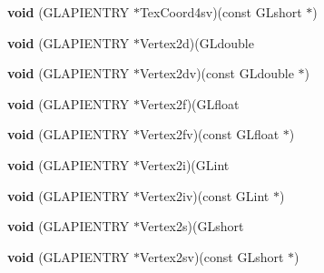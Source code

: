 \begin{DoxyCompactItemize}
\item 
\mbox{\label{struct_____g_ldispatch_table_rec_a38e0e19f1673b1e647ceb3947c328b7c}} 
{\bfseries void} (G\+L\+A\+P\+I\+E\+N\+T\+RY $\ast$Tex\+Coord4sv)(const G\+Lshort $\ast$)
\item 
\mbox{\label{struct_____g_ldispatch_table_rec_adea3ab95cd1e9dc33240e1721c3e088b}} 
{\bfseries void} (G\+L\+A\+P\+I\+E\+N\+T\+RY $\ast$Vertex2d)(G\+Ldouble
\item 
\mbox{\label{struct_____g_ldispatch_table_rec_a8fa01c28a0ea76eeb88a78d87bdfe0e0}} 
{\bfseries void} (G\+L\+A\+P\+I\+E\+N\+T\+RY $\ast$Vertex2dv)(const G\+Ldouble $\ast$)
\item 
\mbox{\label{struct_____g_ldispatch_table_rec_af3f4a8e4058dfa6800a0bccabafb073b}} 
{\bfseries void} (G\+L\+A\+P\+I\+E\+N\+T\+RY $\ast$Vertex2f)(G\+Lfloat
\item 
\mbox{\label{struct_____g_ldispatch_table_rec_a1facc47476b4cf04b6df57d4a36a3519}} 
{\bfseries void} (G\+L\+A\+P\+I\+E\+N\+T\+RY $\ast$Vertex2fv)(const G\+Lfloat $\ast$)
\item 
\mbox{\label{struct_____g_ldispatch_table_rec_a84b597ccc57c7e81a4606ed4ff1e38d0}} 
{\bfseries void} (G\+L\+A\+P\+I\+E\+N\+T\+RY $\ast$Vertex2i)(G\+Lint
\item 
\mbox{\label{struct_____g_ldispatch_table_rec_a71cb083f7ba6d8b36342a5029dfe24bc}} 
{\bfseries void} (G\+L\+A\+P\+I\+E\+N\+T\+RY $\ast$Vertex2iv)(const G\+Lint $\ast$)
\item 
\mbox{\label{struct_____g_ldispatch_table_rec_adf127a89012a6827be3ff1595697b2c4}} 
{\bfseries void} (G\+L\+A\+P\+I\+E\+N\+T\+RY $\ast$Vertex2s)(G\+Lshort
\item 
\mbox{\label{struct_____g_ldispatch_table_rec_aa746031411be94aa70fc1610b7716e11}} 
{\bfseries void} (G\+L\+A\+P\+I\+E\+N\+T\+RY $\ast$Vertex2sv)(const G\+Lshort $\ast$)

\end{DoxyCompactItemize}
